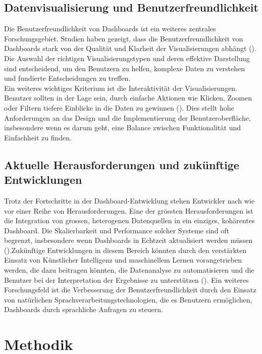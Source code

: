 \documentclass[a4paper, 12pt]{scrartcl}
\begin{document}
\subsection{Datenvisualisierung und Benutzerfreundlichkeit}
Die Benutzerfreundlichkeit von Dashboards ist ein weiteres zentrales Forschungsgebiet. Studien haben gezeigt, dass die Benutzerfreundlichkeit von Dashboards stark von der Qualität und Klarheit der Visualisierungen abhängt (\cite[S.119]{Dibia2023}). Die Auswahl der richtigen Visualisierungstypen und deren effektive Darstellung sind entscheidend, um den Benutzern zu helfen, komplexe Daten zu verstehen und fundierte Entscheidungen zu treffen.\\[1em]Ein weiteres wichtiges Kriterium ist die Interaktivität der Visualisierungen. Benutzer sollten in der Lage sein, durch einfache Aktionen wie Klicken, Zoomen oder Filtern tiefere Einblicke in die Daten zu gewinnen (\cite[S.119]{Dibia2023}). Dies stellt hohe Anforderungen an das Design und die Implementierung der Benutzeroberfläche, insbesondere wenn es darum geht, eine Balance zwischen Funktionalität und Einfachheit zu finden.

\subsection{Aktuelle Herausforderungen und zukünftige Entwicklungen}
Trotz der Fortschritte in der Dashboard-Entwicklung stehen Entwickler nach wie vor einer Reihe von Herausforderungen. Eine der grössten Herausforderungen ist die Integration von grossen, heterogenen Datenquellen in ein einziges, kohärentes Dashboard. Die Skalierbarkeit und Performance solcher Systeme sind oft begrenzt, insbesondere wenn Dashboards in Echtzeit aktualisiert werden müssen (\cite[S.119]{Dibia2023}).\newpage Zukünftige Entwicklungen in diesem Bereich könnten durch den verstärkten Einsatz von Künstlicher Intelligenz und maschinellem Lernen vorangetrieben werden, die dazu beitragen könnten, die Datenanalyse zu automatisieren und die Benutzer bei der Interpretation der Ergebnisse zu unterstützen (\cite[S.119]{Dibia2023}). Ein weiteres Forschungsfeld ist die Verbesserung der Benutzerfreundlichkeit durch den Einsatz von natürlichen Sprachverarbeitungstechnologien, die es Benutzern ermöglichen, Dashboards durch sprachliche Anfragen zu steuern.
\newpage
	\section{Methodik}
	\label{sec:standDerForschung}
\end{document}
